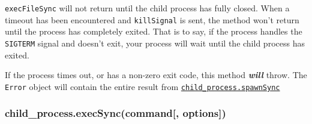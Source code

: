 \texttt{execFileSync} will not return until the child process has fully
closed. When a timeout has been encountered and \texttt{killSignal} is
sent, the method won't return until the process has completely exited.
That is to say, if the process handles the \texttt{SIGTERM} signal and
doesn't exit, your process will wait until the child process has exited.

If the process times out, or has a non-zero exit code, this method
\textbf{\emph{will}} throw. The \texttt{Error} object will contain the
entire result from
\hyperref[childux5fprocessux5fchildux5fprocessux5fspawnsyncux5fcommandux5fargsux5foptions]{\texttt{child\_process.spawnSync}}

\subsubsection{child\_process.execSync(command{[},
options{]})}\label{childux5fprocess.execsynccommand-options}

